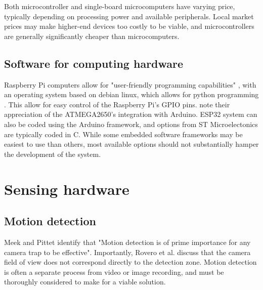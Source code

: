 \documentclass[class=report,11pt,crop=false]{standalone}
\begin{document}
Both microcontroller and single-board microcomputers have varying price, typically depending on processing power and available peripherals. Local market prices may make higher-end devices too costly to be viable, and microcontrollers are generally significantly cheaper than microcomputers.

\subsection{Software for computing hardware}

Raspberry Pi computers allow for "user-friendly programming capabilities" \cite{jolles2021broad-scale}, with an operating system based on debian linux, which allows for python programming \cite{prinz2016a}. This allow for easy control of the Raspberry Pi's GPIO pins. \cite{camacho2017deployment} note their appreciation of the ATMEGA2650's integration with Arduino. ESP32 system can also be coded using the Arduino framework, and options from ST Microelectonics are typically coded in C. While some embedded software frameworks may be easiest to use than others, most available options should not substantially hamper the development of the system.

\section{Sensing hardware}

\subsection{Motion detection}

Meek and Pittet \cite{meek2012user} identify that "Motion detection is of prime importance for any camera trap to be effective". Importantly, Rovero et al. \cite{rovero2013which} discuss that the camera field of view does not correspond directly to the detection zone. Motion detection is often a separate process from video or image recording, and must be thoroughly considered to make for a viable solution.
\end{document}
